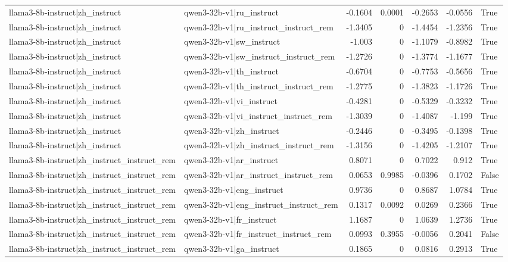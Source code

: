 \begin{table}
\begin{tabular}{l l r r r r l}
llama3-8b-instruct|zh_instruct & qwen3-32b-v1|ru_instruct & -0.1604 & 0.0001 & -0.2653 & -0.0556 & True \\
llama3-8b-instruct|zh_instruct & qwen3-32b-v1|ru_instruct_instruct_rem & -1.3405 & 0 & -1.4454 & -1.2356 & True \\
llama3-8b-instruct|zh_instruct & qwen3-32b-v1|sw_instruct & -1.003 & 0 & -1.1079 & -0.8982 & True \\
llama3-8b-instruct|zh_instruct & qwen3-32b-v1|sw_instruct_instruct_rem & -1.2726 & 0 & -1.3774 & -1.1677 & True \\
llama3-8b-instruct|zh_instruct & qwen3-32b-v1|th_instruct & -0.6704 & 0 & -0.7753 & -0.5656 & True \\
llama3-8b-instruct|zh_instruct & qwen3-32b-v1|th_instruct_instruct_rem & -1.2775 & 0 & -1.3823 & -1.1726 & True \\
llama3-8b-instruct|zh_instruct & qwen3-32b-v1|vi_instruct & -0.4281 & 0 & -0.5329 & -0.3232 & True \\
llama3-8b-instruct|zh_instruct & qwen3-32b-v1|vi_instruct_instruct_rem & -1.3039 & 0 & -1.4087 & -1.199 & True \\
llama3-8b-instruct|zh_instruct & qwen3-32b-v1|zh_instruct & -0.2446 & 0 & -0.3495 & -0.1398 & True \\
llama3-8b-instruct|zh_instruct & qwen3-32b-v1|zh_instruct_instruct_rem & -1.3156 & 0 & -1.4205 & -1.2107 & True \\
llama3-8b-instruct|zh_instruct_instruct_rem & qwen3-32b-v1|ar_instruct & 0.8071 & 0 & 0.7022 & 0.912 & True \\
llama3-8b-instruct|zh_instruct_instruct_rem & qwen3-32b-v1|ar_instruct_instruct_rem & 0.0653 & 0.9985 & -0.0396 & 0.1702 & False \\
llama3-8b-instruct|zh_instruct_instruct_rem & qwen3-32b-v1|eng_instruct & 0.9736 & 0 & 0.8687 & 1.0784 & True \\
llama3-8b-instruct|zh_instruct_instruct_rem & qwen3-32b-v1|eng_instruct_instruct_rem & 0.1317 & 0.0092 & 0.0269 & 0.2366 & True \\
llama3-8b-instruct|zh_instruct_instruct_rem & qwen3-32b-v1|fr_instruct & 1.1687 & 0 & 1.0639 & 1.2736 & True \\
llama3-8b-instruct|zh_instruct_instruct_rem & qwen3-32b-v1|fr_instruct_instruct_rem & 0.0993 & 0.3955 & -0.0056 & 0.2041 & False \\
llama3-8b-instruct|zh_instruct_instruct_rem & qwen3-32b-v1|ga_instruct & 0.1865 & 0 & 0.0816 & 0.2913 & True \\

\end{tabular}
\end{table}
